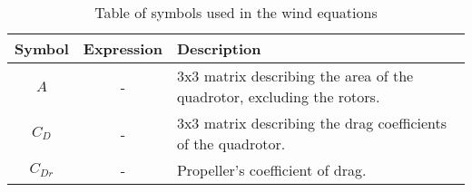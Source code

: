     \begin{table}
        \begin{tabularx}{\tablewidth}{|c|c|X|}\hline
            \textbf{Symbol} & \textbf{Expression} & \textbf{Description} \\\hline
            $A$ & - & 3x3 matrix describing the area of the quadrotor, excluding the rotors. \\\hline
            $C_{D}$ & - & 3x3 matrix describing the drag coefficients of the quadrotor. \\\hline
            $C_{Dr}$ & - & Propeller's coefficient of drag. \\\hline
        \end{tabularx}
        \label{tbl:observer:wind:symbols}
        \caption{Table of symbols used in the wind equations}
    \end{table}
